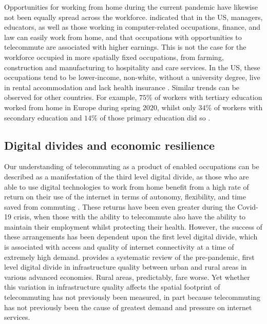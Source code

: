 \documentclass[,]{sagej}
\begin{document}
Opportunities for working from home during the current pandemic have
likewise not been equally spread across the workforce.
\citet{NBERw26948} indicated that in the US, managers, educators, as
well as those working in computer-related occupations, finance, and law
can easily work from home, and that occupations with opportunities to
telecommute are associated with higher earnings. This is not the case
for the workforce occupied in more spatially fixed occupations, from
farming, construction and manufacturing to hospitality and care
services. In the US, these occupations tend to be lower-income,
non-white, without a university degree, live in rental accommodation and
lack health insurance \citep{NBERw27085}. Similar trends can be observed
for other countries. For example, \(75\)\% of workers with tertiary
education worked from home in Europe during spring \(2020\), whilst only
\(34\)\% of workers with secondary education and \(14\)\% of those
primary education did so \citep{eurofound2020}.

\hypertarget{sec:2.2}{%
\subsection{Digital divides and economic resilience}\label{sec:2.2}}

Our understanding of telecommuting as a product of enabled occupations
can be described as a manifestation of the third level digital divide,
as those who are able to use digital technologies to work from home
benefit from a high rate of return on their use of the internet in terms
of autonomy, flexibility, and time saved from commuting
\citep{peters2004employees, siha2006telecommuting, singh2013modeling}.
These returns have been even greater during the Covid-19 crisis, when
those with the ability to telecommute also have the ability to maintain
their employment whilst protecting their health. However, the success of
these arrangements has been dependent upon the first level digital
divide, which is associated with access and quality of internet
connectivity at a time of extremely high demand. \citet{SALEMINK2017360}
provides a systematic review of the pre-pandemic, first level digital
divide in infrastructure quality between urban and rural areas in
various advanced economies. Rural areas, predictably, fare worse. Yet
whether this variation in infrastructure quality affects the spatial
footprint of telecommuting has not previously been measured, in part
because telecommuting has not previously been the cause of greatest
demand and pressure on internet services.
\end{document}
